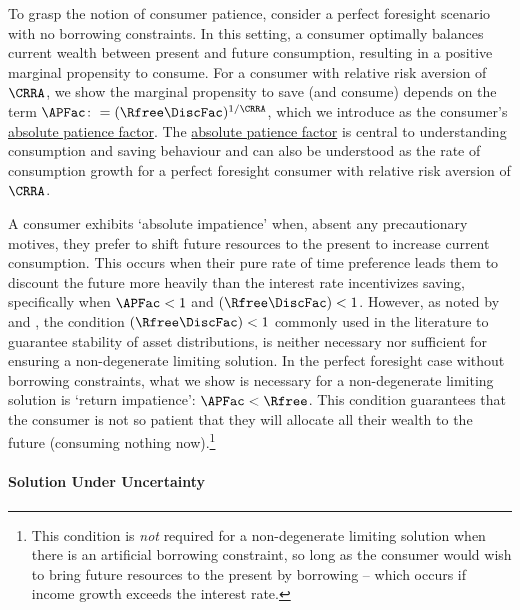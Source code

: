 \documentclass[BufferStockTheory]{subfiles}
\begin{document}
To grasp the notion of consumer patience, consider a perfect foresight scenario with no borrowing constraints. In this setting, a consumer optimally balances current wealth between present and future consumption, resulting in a positive marginal propensity to consume. For a consumer with relative risk aversion of $\CRRA$, we show the marginal propensity to save (and consume) depends on the term $\APFac\colon =(\Rfree \DiscFac)^{1/\CRRA}$, which we introduce as the consumer's \hyperlink{APFAC}{absolute patience factor}. The \hyperlink{APFAC}{absolute patience factor} is central to understanding consumption and saving behaviour and can also be understood as the rate of consumption growth for a perfect foresight consumer with relative risk aversion of $\CRRA$.


A consumer exhibits `absolute impatience' when, absent any precautionary motives, they prefer to shift future resources to the present to increase current consumption. This occurs when their pure rate of time preference leads them to discount the future more heavily than the interest rate incentivizes saving, specifically when $\APFac < 1$ and $(\Rfree \DiscFac) < 1$. However, as noted by \cite{szeidlInvariant} and \cite{maUnboundedDP}, the condition $(\Rfree \DiscFac) < 1$ commonly used in the literature to guarantee stability of asset distributions, is neither necessary nor sufficient for ensuring a non-degenerate limiting solution. In the perfect foresight case without borrowing constraints, what we show is necessary for a non-degenerate limiting solution is `return impatience': $\APFac < \Rfree$.
This condition guarantees that the consumer is not so patient that they will allocate all their wealth to the future (consuming nothing now).\footnote{This condition is \textit{not} required for a non-degenerate limiting solution when there is an artificial borrowing constraint, so long as the consumer would wish to bring future resources to the present by borrowing -- which occurs if income growth exceeds the interest rate.}


\paragraph{Solution Under Uncertainty}
\end{document}
